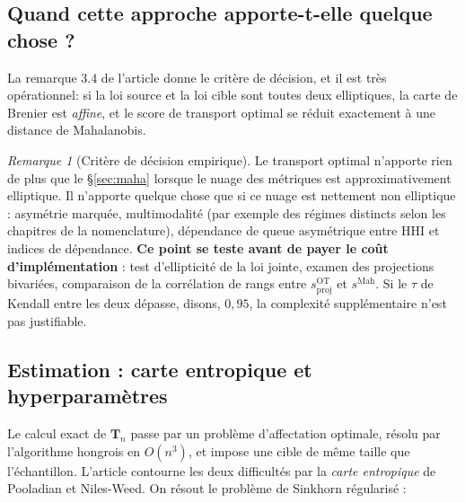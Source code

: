\documentclass[11pt,a4paper]{article}
\theoremstyle{definition}
\theoremstyle{remark}
\newtheorem{remarque}{Remarque}[section]
\newcommand{\Tmap}{\mathbf{T}}
\begin{document}
\subsection{Quand cette approche apporte-t-elle quelque chose ?}
\label{sec:otvsmaha}

La remarque 3.4 de l'article donne le critère de décision, et il est très opérationnel: si la
loi source et la loi cible sont toutes deux elliptiques, la carte de Brenier est \emph{affine},
et le score de transport optimal se réduit exactement à une distance de Mahalanobis.

\medskip

\begin{remarque}[Critère de décision empirique]
  Le transport optimal n'apporte rien de plus que le §\ref{sec:maha} lorsque le nuage des métriques
  est approximativement elliptique. Il n'apporte quelque chose que si ce nuage est nettement
  non elliptique : asymétrie marquée, multimodalité (par exemple des régimes distincts selon les
  chapitres de la nomenclature), dépendance de queue asymétrique entre HHI et indices de
  dépendance. \textbf{Ce point se teste avant de payer le coût d'implémentation} : test d'ellipticité
  de la loi jointe, examen des projections bivariées, comparaison de la corrélation de rangs entre
  $s^{\mathrm{OT}}_{\mathrm{proj}}$ et $s^{\mathrm{Mah}}$. Si le $\tau$ de Kendall entre les deux
  dépasse, disons, $0{,}95$, la complexité supplémentaire n'est pas justifiable.
\end{remarque}

\bigskip

\subsection{Estimation : carte entropique et hyperparamètres}
\label{sec:entropique}

\medskip

Le calcul exact de $\Tmap_n$ passe par un problème d'affectation optimale, résolu par l'algorithme
hongrois en $O(n^3)$, et impose une cible de même taille que l'échantillon. L'article contourne
les deux difficultés par la \emph{carte entropique} de Pooladian et Niles-Weed. On résout le
problème de Sinkhorn régularisé :
\end{document}
